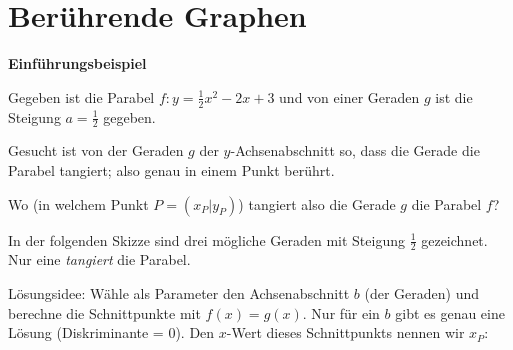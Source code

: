 \section{Berührende Graphen}

\textbf{Einführungsbeispiel}


Gegeben ist die Parabel $f: y=\frac{1}{2}x^2 -2x +3$ und von einer
Geraden $g$ ist die Steigung $a =\frac12$ gegeben.

Gesucht ist von der Geraden $g$ der $y$-Achsenabschnitt so, dass die
Gerade die Parabel tangiert; also genau in einem Punkt berührt.

Wo (in welchem Punkt $P=(x_P|y_P)$) tangiert also die Gerade $g$ die Parabel $f$?

In der folgenden Skizze sind drei mögliche Geraden mit Steigung
$\frac{1}{2}$ gezeichnet. Nur eine \textit{tangiert} die Parabel.


Lösungsidee: Wähle als Parameter den Achsenabschnitt $b$ (der Geraden)
und berechne die Schnittpunkte mit $f(x) = g(x)$. Nur für ein $b$ gibt
es genau eine Lösung (Diskriminante = 0). Den $x$-Wert dieses
Schnittpunkts nennen wir $x_P$:


\newpage

